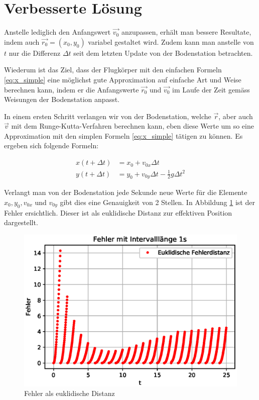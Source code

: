 \section{Verbesserte Lösung
\label{perturbation:section:verbesserte_loesung}}

Anstelle lediglich den Anfangswert $\vec{v_0}$ anzupassen, erhält man bessere Resultate, indem auch $\vec{r_0} = (x_0, y_0)$ variabel gestaltet wird.
Zudem kann man anstelle von $t$ nur die Differenz $\Delta t$ seit dem letzten Update von der Bodenstation betrachten.

Wiederum ist das Ziel, dass der Flugkörper mit den einfachen Formeln \eqref{eq:x_simple} eine möglichst gute Approximation auf einfache Art und Weise berechnen kann,
indem er die Anfangswerte $\vec{r_0}$ und $\vec{v_0}$ im Laufe der Zeit gemäss Weisungen der Bodenstation anpasst.

In einem ersten Schritt verlangen wir von der Bodenstation, welche $\vec{r}$, aber auch $\vec{v}$ mit dem Runge-Kutta-Verfahren berechnen kann,
eben diese Werte um so eine Approximation mit den simplen Formeln \eqref{eq:x_simple} tätigen zu können.
Es ergeben sich folgende Formeln:

\begin{equation}
\begin{aligned}
x(t + \Delta t) &= x_0 + v_{0x}\Delta t\\
y(t + \Delta t) &= y_0 + v_{0y}\Delta t - \frac{1}{2}g\Delta t^2
\end{aligned}
\end{equation}

Verlangt man von der Bodenstation jede Sekunde neue Werte für die Elemente $x_0, y_0, v_{0x}$ und $v_{0y}$ gibt dies eine Genauigkeit von 2 Stellen.
In Abbildung \ref{error} ist der Fehler ersichtlich.
Dieser ist als euklidische Distanz zur effektiven Position dargestellt.

\begin{figure}
    \centering
    \includegraphics[scale = 0.7]{papers/perturbation/bilder/perturbation_fig3.eps}
    \caption{Fehler als euklidische Distanz}
	\label{error}
\end{figure}